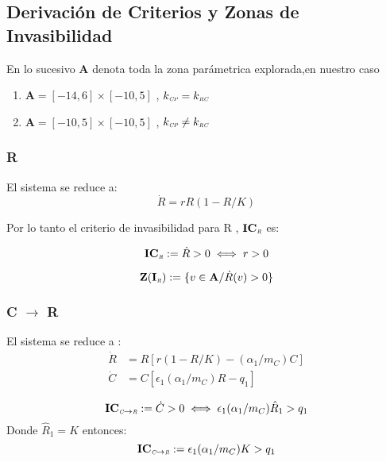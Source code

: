 \subsection{Derivaci\'on de Criterios y Zonas de Invasibilidad}\label{subsec:CI}

En lo sucesivo $\mathbf{A}$ denota toda la zona par\'ametrica explorada,en nuestro caso 
\begin{enumerate}
\item $\mathbf{A} = [-14,6] \times [-10,5]$ , $k_{\textit{\tiny CP}} = k_{\textit{\tiny RC}}$
\item $\mathbf{A} = [-10,5] \times [-10,5]$ , $k_{\textit{\tiny CP}} \not= k_{\textit{\tiny RC}}$
\end{enumerate}

\subsubsection{R}
El sistema se reduce a:
\begin{equation}
\dot{R}= rR(1-R/K)
\end{equation}

Por lo tanto el criterio de invasibilidad para R , $\mathbf{IC_{\textit{\tiny R}}}$ es:

\begin{equation}\label{eq:ICR}
\mathbf{IC_{\textit{\tiny R}}} := \dot{R} > 0 \iff r > 0
\end{equation}

\begin{equation}
\mathbf{Z(I_{\textit{\tiny R}})} := \{ v \in \mathbf{A} / \dot{R}(v)>0 \}
\end{equation}

\subsubsection{C $\to$ R}
El sistema se reduce a :
\begin{equation}
\begin{aligned}
\dot{R} &= R\left[r(1-R/K)- (\alpha_{1}/m_C) C \right] \\
\dot{C} &= C \left[\epsilon_1 (\alpha_{1}/m_C) R  -q_1 \right]
\end{aligned}
\end{equation}


\begin{equation} \mathbf{IC_{\textit{\tiny C} \to \textit{\tiny R}}} := \dot{C} >0 \iff \epsilon_1(\alpha_1/m_C)\hat{R}_1 > q_1  \end{equation}
Donde $\hat{R}_1 = K$ entonces:
\begin{equation} \mathbf{IC_{\textit{\tiny C} \to \textit{\tiny R}}} := \epsilon_1(\alpha_1/m_C) K > q_1 \end{equation}
            
